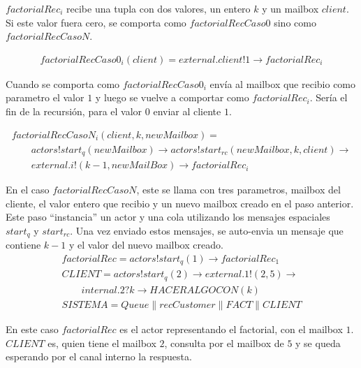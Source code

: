 \documentclass[fleqn]{article}
\begin{document}
$factorialRec_i$ recibe una tupla con dos valores, un entero $k$ y un mailbox $client$. Si este valor fuera cero, se comporta como $factorialRecCaso0$ sino como $factorialRecCasoN$. 

\begin{gather*}
factorialRecCaso0_i(client) = external.client!1 \rightarrow factorialRec_i 
\end{gather*}

Cuando se comporta como $factorialRecCaso0_i$ envía al mailbox que recibio como parametro el valor $1$ y luego se vuelve a comportar como $factorialRec_i$. Sería el fin de la recursión, para el valor $0$ enviar al cliente $1$.

\begin{gather*}
factorialRecCasoN_i(client,k, newMailbox) = \\
  \qquad actors!start_q(newMailbox) \rightarrow actors!start_{rc}(newMailbox, k, client) \rightarrow \\
  \qquad external.i!(k - 1, newMailBox) \rightarrow factorialRec_i
\end{gather*}

En el caso $factorialRecCasoN$, este se llama con tres parametros, mailbox del cliente, el valor entero que recibio y un nuevo mailbox creado en el paso anterior. Este paso ``instancia'' un actor y una cola utilizando los mensajes espaciales $start_q$ y $start_{rc}$. Una vez enviado estos mensajes, se auto-envia un mensaje que contiene $k - 1$ y el valor del nuevo mailbox creado.\\

\begin{gather*}
factorialRec =
  actors!start_q(1) \rightarrow factorialRec_1 \\
CLIENT =
  actors!start_q(2) \rightarrow external.1!(2,5) \rightarrow \\
\qquad internal.2?k \rightarrow HACERALGOCON(k) \\
SISTEMA = Queue \parallel recCustomer \parallel FACT \parallel CLIENT
\end{gather*}

En este caso $factorialRec$ es el actor representando el factorial, con el mailbox $1$. $CLIENT$ es, quien tiene el mailbox $2$, consulta por el mailbox de $5$ y se queda esperando por el canal interno la respuesta.

{}

\end{document}
